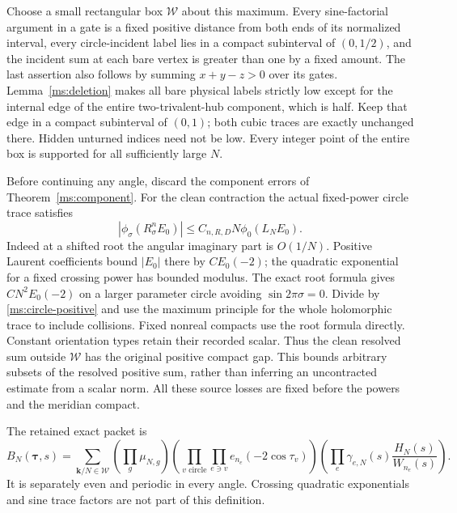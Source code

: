 Choose a small rectangular box $\mathcal W$ about this maximum.
Every sine-factorial argument in a gate is a fixed positive distance
from both ends of its normalized interval, every circle-incident label
lies in a compact subinterval of $(0,1/2)$, and the incident sum
at each bare vertex is greater than one by a fixed amount. The
last assertion also follows by summing $x+y-z>0$ over its gates.
Lemma~\ref{ms:deletion} makes all bare physical labels strictly
low except for the internal edge of the entire two-trivalent-hub
component, which is half. Keep that edge in a compact subinterval
of $(0,1)$; both cubic traces are exactly unchanged there. Hidden
unturned indices need not be low. Every integer point of the
entire box is supported for all sufficiently large $N$.

Before continuing any angle, discard the component errors of
Theorem~\ref{ms:component}. For the clean contraction the actual
fixed-power circle trace satisfies
\begin{equation}\label{ms:fixed-power-positive}
 |\phi_\sigma(R_\sigma^n E_0)|
       \le C_{n,R,D}N\phi_0(L_NE_0).
\end{equation}
Indeed at a shifted root the angular imaginary part is $O(1/N)$.
Positive Laurent coefficients bound $|E_0|$ there by $C E_0(-2)$;
the quadratic exponential for a fixed crossing power has bounded modulus. The exact root formula
gives $C N^2E_0(-2)$ on a larger parameter circle avoiding
$\sin2\pi\sigma=0$. Divide by \eqref{ms:circle-positive} and
use the maximum principle for the whole holomorphic trace to
include collisions. Fixed nonreal compacts use the root formula
directly. Constant orientation types retain their recorded scalar.
Thus the clean resolved sum outside $\mathcal W$ has the original
positive compact gap. This bounds arbitrary subsets of the
resolved positive sum, rather than inferring an uncontracted
estimate from a scalar norm. All these source losses are fixed
before the powers and the meridian compact.

The retained exact packet is
\begin{equation}\label{ms:finite-packet}
 B_N(\boldsymbol\tau,s)=
 \sum_{\mathbf k/N\in\mathcal W}
 \left(\prod_g\mu_{N,g}\right)
 \left(\prod_{v\text{ circle}}\prod_{e\ni v}
                    e_{n_e}( -2\cos\tau_v)\right)
 \left(\prod_e\gamma_{e,N}(s)\frac{H_N(s)}{W_{n_e}(s)}\right).
\end{equation}
It is separately even and periodic in every angle. Crossing
quadratic exponentials and sine trace factors are not part of this definition.

